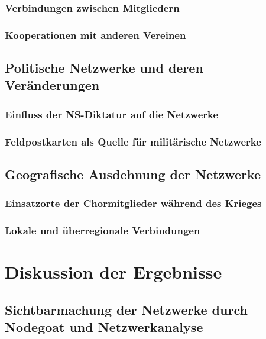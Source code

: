 \documentclass[12pt, a4paper, ngerman, bidi=default]{article}
\begin{document}
    \subsubsection{Verbindungen zwischen Mitgliedern}
    \subsubsection{ Kooperationen mit anderen Vereinen}
\subsection{ Politische Netzwerke und deren Veränderungen}
    \subsubsection{Einfluss der NS-Diktatur auf die Netzwerke}
    \subsubsection{Feldpostkarten als Quelle für militärische Netzwerke}
    
 \subsection{ Geografische Ausdehnung der Netzwerke}
  \subsubsection{Einsatzorte der Chormitglieder während des Krieges}
  \subsubsection{ Lokale und überregionale Verbindungen}
  \newpage
\section{Diskussion der Ergebnisse}
  \subsection{Sichtbarmachung der Netzwerke durch Nodegoat und Netzwerkanalyse}
\end{document}
